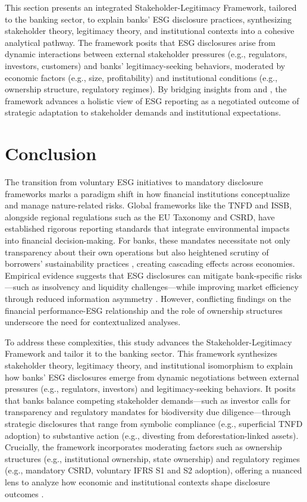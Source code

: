 \documentclass[
  authoryear]{elsarticle}
\begin{document}
This section presents an integrated Stakeholder-Legitimacy Framework,
tailored to the banking sector, to explain banks' ESG disclosure
practices, synthesizing stakeholder theory, legitimacy theory, and
institutional contexts into a cohesive analytical pathway. The framework
posits that ESG disclosures arise from dynamic interactions between
external stakeholder pressures (e.g., regulators, investors, customers)
and banks' legitimacy-seeking behaviors, moderated by economic factors
(e.g., size, profitability) and institutional conditions (e.g.,
ownership structure, regulatory regimes). By bridging insights from
\citet{CAMPBELL2007} and \citet{AGUINIS2012}, the framework advances a
holistic view of ESG reporting as a negotiated outcome of strategic
adaptation to stakeholder demands and institutional expectations.

\section{Conclusion}\label{conclusion}

The transition from voluntary ESG initiatives to mandatory disclosure
frameworks marks a paradigm shift in how financial institutions
conceptualize and manage nature-related risks. Global frameworks like
the TNFD and ISSB, alongside regional regulations such as the EU
Taxonomy and CSRD, have established rigorous reporting standards that
integrate environmental impacts into financial decision-making. For
banks, these mandates necessitate not only transparency about their own
operations but also heightened scrutiny of borrowers' sustainability
practices \citep[see][]{WANG2023}, creating cascading effects across
economies. Empirical evidence suggests that ESG disclosures can mitigate
bank-specific risks---such as insolvency and liquidity
challenges---while improving market efficiency through reduced
information asymmetry \citep{GANGI2019, SCHOLTENS2019, GANGWANI2024}.
However, conflicting findings on the financial performance-ESG
relationship and the role of ownership structures underscore the need
for contextualized analyses.

To address these complexities, this study advances the
Stakeholder-Legitimacy Framework and tailor it to the banking sector.
This framework synthesizes stakeholder theory, legitimacy theory, and
institutional isomorphism to explain how banks' ESG disclosures emerge
from dynamic negotiations between external pressures (e.g., regulators,
investors) and legitimacy-seeking behaviors. It posits that banks
balance competing stakeholder demands---such as investor calls for
transparency and regulatory mandates for biodiversity due
diligence---through strategic disclosures that range from symbolic
compliance (e.g., superficial TNFD adoption) to substantive action
(e.g., divesting from deforestation-linked assets). Crucially, the
framework incorporates moderating factors such as ownership structures
(e.g., institutional ownership, state ownership) and regulatory regimes
(e.g., mandatory CSRD, voluntary IFRS S1 and S2 adoption), offering a
nuanced lens to analyze how economic and institutional contexts shape
disclosure outcomes \citep{CAMPBELL2007, AGUINIS2012}.
\end{document}
